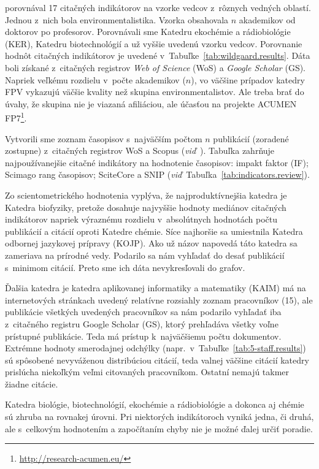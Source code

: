 \citet{Wildgaard2015} porovnával 17 citačných indikátorov na vzorke vedcov
z~rôznych vedných oblastí.  Jednou z~nich bola environmentalistika.  Vzorka
obsahovala $n$ akademikov od doktorov po profesorov.  Porovnávali sme Katedru
ekochémie a rádiobiológie (KER), Katedru biotechnológií a už vyššie uvedenú
vzorku vedcov.  Porovnanie hodnôt citačných indikátorov je uvedené
v~Tabuľke~\ref{tab:wildgaard.results}.  Dáta boli získané z~citačných registrov
\emph{Web of Science} (WoS) a \emph{Google Scholar} (GS).  Napriek veľkému
rozdielu v~počte akademikov ($n$), vo väčšine prípadov katedry FPV vykazujú
väčšie kvality než skupina environmentalistov.  Ale treba brať do úvahy, že
skupina nie je viazaná afiliáciou, ale účasťou na projekte ACUMEN
FP7\footnote{\url{http://research-acumen.eu/}}.

Vytvorili sme zoznam časopisov s~najväčším počtom $n$ publikácií (zoradené
zostupne) z~citačných registrov WoS a Scopus
(\emph{viď}~).  Tabuľka zahrňuje najpoužívanejšie citačné
indikátory na hodnotenie časopisov: impakt faktor (IF); Scimago rang časopisov;
SciteCore a SNIP (\emph{viď}~Tabuľka~\ref{tab:indicators.review}).

Zo scientometrického hodnotenia vyplýva, že najproduktívnejšia katedra je
Katedra biofyziky, pretože dosahuje najvyššie hodnoty mediánov citačných
indikátorov napriek výraznému rozdielu v~absolútnych hodnotách počtu publikácií
a citácií oproti Katedre chémie.  Síce najhoršie sa umiestnila Katedra odbornej
jazykovej prípravy (KOJP).  Ako už názov napovedá táto katedra sa zameriava na
prírodné vedy.  Podarilo sa nám vyhľadať do desať publikácií s~minimom citácií.
Preto sme ich dáta nevykresľovali do grafov.

Ďalšia katedra je katedra aplikovanej informatiky a matematiky (KAIM) má na
internetových stránkach uvedený relatívne rozsiahly zoznam pracovníkov (15), ale
publikácie všetkých uvedených pracovníkov sa nám podarilo vyhľadať iba
z~citačného registru Google Scholar (GS), ktorý prehľadáva všetky voľne
prístupné publikácie.  Teda má prístup k~najväčšiemu počtu dokumentov.  Extrémne
hodnoty smerodajnej odchýlky (napr.~v~Tabuľke~\ref{tab:5-staff.results}) sú
spôsobené nevyváženou distribúciou citácií, teda valnej väčšine citácií katedry
prislúcha niekoľkým veľmi citovaných pracovníkom.  Ostatní nemajú takmer žiadne
citácie.

Katedra biológie, biotechnológií, ekochémie a rádiobiológie a dokonca aj chémie
sú zhruba na rovnakej úrovni.  Pri niektorých indikátoroch vyniká jedna, či
druhá, ale s~celkovým hodnotením a započítaním chyby nie je možné ďalej určiť
poradie.


